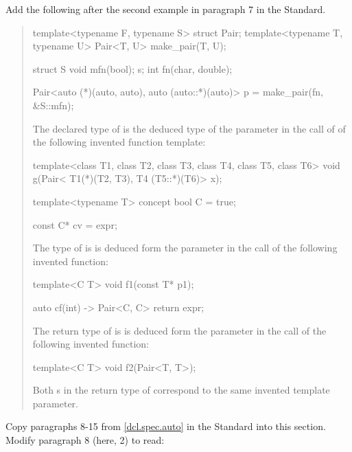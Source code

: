 Add the following after the second example in paragraph 7 in the \Cpp Standard.

\begin{quote}
\begin{addedblock}
\enterexample
\begin{codeblock}
template<typename F, typename S> struct Pair;
template<typename T, typename U> Pair<T, U> make_pair(T, U);

struct S { void mfn(bool); } s;
int fn(char, double);

Pair<auto (*)(auto, auto), auto (auto::*)(auto)> p = make_pair(fn, &S::mfn);
\end{codeblock}
The declared type of  is the deduced type of the parameter 
 in the call of  of the following 
invented function template:
\begin{codeblock}
template<class T1, class T2, class T3, class T4, class T5, class T6>
void g(Pair< T1(*)(T2, T3), T4 (T5::*)(T6)> x);
\end{codeblock}
\exitexample

\enterexample
\begin{codeblock}
template<typename T> concept bool C = true;

const C* cv = expr;
\end{codeblock}
The type of  is is deduced form the parameter  in the
call  of the following invented function:
\begin{codeblock}
template<C T> void f1(const T* p1);
\end{codeblock}
\exitexample

\enterexample
\begin{codeblock}
auto cf(int) -> Pair<C, C> { return expr; }
\end{codeblock}
The return type of  is is deduced form the parameter  in the
call  of the following invented function:
\begin{codeblock}
template<C T> void f2(Pair<T, T>);
\end{codeblock}
Both s in the return type of 
 correspond to the same invented template parameter.
\exitexample
\end{addedblock}
\end{quote}

Copy paragraphs 8-15 from \ref{dcl.spec.auto} in the \Cpp Standard into
this section. Modify paragraph 8 (here, 2) to read:

